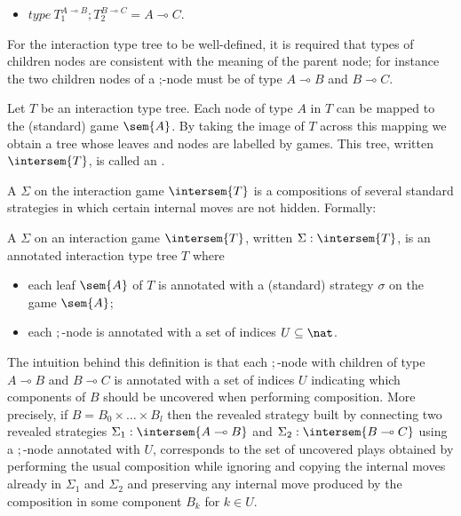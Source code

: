 \begin{definition}
\begin{itemize}
\begin{itemize}
    \item $type\ T_1^{A \multimap B};T_2^{B \multimap C} = A \multimap C$.
    \end{itemize}

\end{itemize}

For the interaction type tree to be well-defined, it is required
that types of children nodes are consistent with the meaning of the
parent node; for instance the two children nodes of a ;-node must be
of type $A\multimap B$ and $B\multimap C$.

\end{definition}


Let $T$ be an interaction type tree. Each node of type $A$ in $T$
can be mapped to the (standard) game $\sem{A}$. By taking the image
of $T$ across this mapping we obtain a tree whose leaves and nodes
are labelled by games. This tree, written $\intersem{T}$, is called
an .

A  $\Sigma$ on the interaction game $\intersem{T}$ is a compositions of several standard strategies in which certain internal moves are not hidden. Formally:
\begin{definition}
A  $\Sigma$ on an interaction game $\intersem{T}$,
written $\Sigma: \intersem{T}$, is an annotated interaction type
tree $T$ where
\begin{itemize}
\item each leaf $\sem{A}$ of $T$ is annotated with a (standard) strategy $\sigma$ on the game
$\sem{A}$;
\item each $;$-node is annotated with a set of indices $U \subseteq \nat$.
\end{itemize}
\end{definition}

The intuition behind this definition is that each $;$-node with children of type $A\multimap B$ and $B\multimap C$ is annotated with a set of indices $U$ indicating which components of $B$ should be uncovered when performing composition.
More precisely, if $B = B_0 \times \ldots \times B_l$ then the revealed strategy built by connecting two revealed strategies $\Sigma_1 : \intersem{A\multimap B}$ and $\Sigma_2 : \intersem{B\multimap C}$
using a $;$-node annotated with $U$, corresponds to the
set of uncovered plays obtained
by performing the usual composition while ignoring and copying the internal moves already in $\Sigma_1$ and $\Sigma_2$ and preserving any internal
move produced by the composition in some component $B_k$ for $k \in U$.

